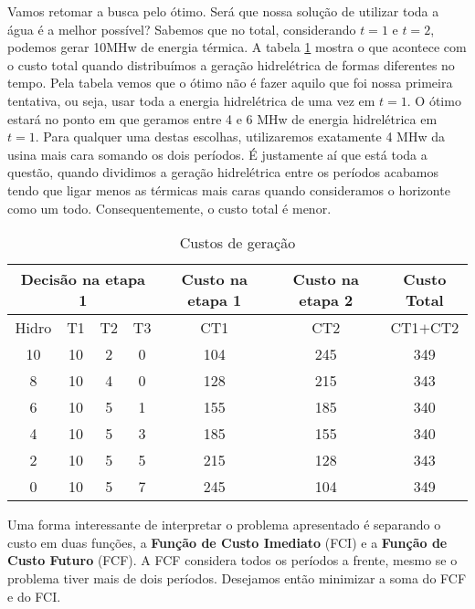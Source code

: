 Vamos retomar a busca pelo ótimo. Será que nossa solução de utilizar toda a água é a melhor possível? Sabemos que no total, considerando $t=1$ e $t=2$, podemos gerar 10MHw de energia térmica. A tabela \ref{tab:5.1} mostra o que acontece com o custo total quando distribuímos a geração hidrelétrica de formas diferentes no tempo. Pela tabela vemos que o ótimo não é fazer aquilo que foi nossa primeira tentativa, ou seja, usar toda a energia hidrelétrica de uma vez em $t=1$. O ótimo estará no ponto em que geramos entre 4 e 6 MHw de energia hidrelétrica em $t=1$. Para qualquer uma destas escolhas, utilizaremos exatamente 4 MHw da usina mais cara somando os dois períodos. É justamente aí que está toda a questão, quando dividimos a geração hidrelétrica entre os períodos acabamos tendo que ligar menos as térmicas mais caras quando consideramos o horizonte como um todo. Consequentemente, o custo total é menor.  

\begin{table}[h]
\caption{Custos de geração}
\label{tab:5.1}
\centering
\begin{tabular}{ccccccc}
\hline
\multicolumn{4}{c}{Decisão na etapa 1} & Custo na etapa 1 & Custo na etapa 2 & Custo Total \\ \hline
Hidro      & T1      & T2     & T3     & CT1              & CT2              & CT1$+$CT2   \\ \hline
10         & 10      & 2      & 0      & 104              & 245              & 349         \\
8          & 10      & 4      & 0      & 128              & 215              & 343         \\
6          & 10      & 5      & 1      & 155              & 185              & 340         \\
4          & 10      & 5      & 3      & 185              & 155              & 340         \\
2          & 10      & 5      & 5      & 215              & 128              & 343         \\
0          & 10      & 5      & 7      & 245              & 104              & 349         \\ \hline
\end{tabular}
\end{table}


Uma forma interessante de interpretar o problema apresentado é separando o custo em duas funções, a \textbf{Função de Custo Imediato} (FCI)
 e a \textbf{Função de Custo Futuro} (FCF). A FCF considera todos os períodos a frente, mesmo se o problema tiver mais de dois períodos. Desejamos então minimizar a soma do FCF e do FCI. 

